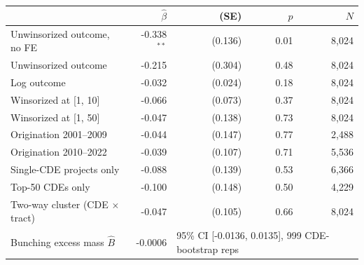 {\footnotesize\setlength{\tabcolsep}{4pt}
\begin{tabular}{lrrrr}
\toprule
 & $\hat\beta$ & (SE) & $p$ & $N$ \\
\midrule
Unwinsorized outcome, no FE & -0.338$^{**}$ & (0.136) & 0.01 & 8,024 \\
Unwinsorized outcome & -0.215 & (0.304) & 0.48 & 8,024 \\
Log outcome & -0.032 & (0.024) & 0.18 & 8,024 \\
Winsorized at [1, 10] & -0.066 & (0.073) & 0.37 & 8,024 \\
Winsorized at [1, 50] & -0.047 & (0.138) & 0.73 & 8,024 \\
Origination 2001--2009 & -0.044 & (0.147) & 0.77 & 2,488 \\
Origination 2010--2022 & -0.039 & (0.107) & 0.71 & 5,536 \\
Single-CDE projects only & -0.088 & (0.139) & 0.53 & 6,366 \\
Top-50 CDEs only & -0.100 & (0.148) & 0.50 & 4,229 \\
Two-way cluster (CDE $\times$ tract) & -0.047 & (0.105) & 0.66 & 8,024 \\
\midrule
Bunching excess mass $\hat B$ & -0.0006 & \multicolumn{3}{l}{95\% CI [-0.0136, 0.0135], 999 CDE-bootstrap reps} \\
\bottomrule
\end{tabular}}
